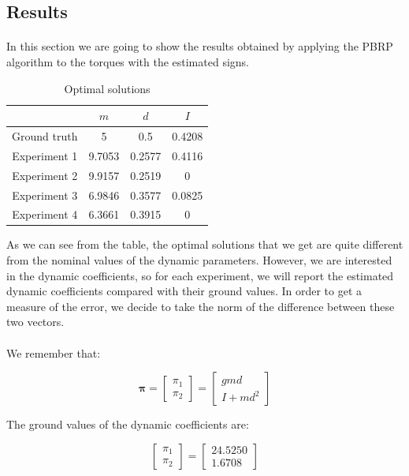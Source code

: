 \documentclass{article}
\begin{document}
\subsection{Results}
\paragraph{}In this section we are going to show the results obtained by applying the PBRP algorithm to the torques with the estimated signs.

\begin{table}[!htbp]
\centering
\begin{tabular}{|c|ccc|}
\hline
& $m$ & $d$ & $I$\\
\hline
Ground truth & 5 & 0.5 & 0.4208\\
Experiment 1 & 9.7053 & 0.2577 & 0.4116\\
Experiment 2 & 9.9157 & 0.2519 & 0\\
Experiment 3 & 6.9846 & 0.3577 & 0.0825\\
Experiment 4 & 6.3661 & 0.3915 & 0\\
\hline
\end{tabular}
\caption{Optimal solutions}
\end{table}

As we can see from the table, the optimal solutions that we get are quite different from the nominal values of the dynamic parameters. However, we are interested in the dynamic coefficients, so for each experiment, we will report the estimated dynamic coefficients compared with their ground values. In order to get a measure of the error, we decide to take the norm of the difference between these two vectors.

\paragraph{}We remember that:

\[\bm{\pi}= \begin{bmatrix}
\pi_1 \\ \pi_2
\end{bmatrix} = \begin{bmatrix}
gmd \\ I +md^2
\end{bmatrix}\]

The ground values of the dynamic coefficients are:

\[\begin{bmatrix}
\pi_1 \\ \pi_2
\end{bmatrix}=\begin{bmatrix}
24.5250 \\ 1.6708
\end{bmatrix}\]
\end{document}
